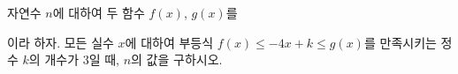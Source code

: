 자연수 $n$에 대하여 두 함수 $f(x)$, $g(x)$를\par\smallskip{}\par\smallskip\noindent 이라 하자. 모든 실수 $x$에 대하여 부등식 $f(x)\le-4x+k\le g(x)$를 만족시키는 정수 $k$의 개수가 $3$일 때, $n$의 값을 구하시오.
